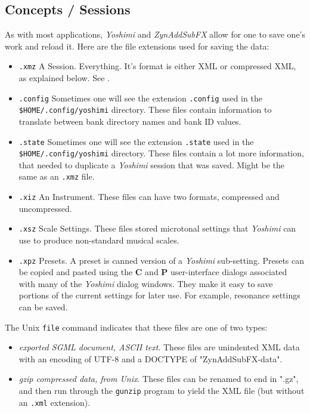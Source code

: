 \subsection{Concepts / Sessions}
\label{subsec:concepts_sessions}

   As with most applications, \textsl{Yoshimi} and \textsl{ZynAddSubFX}
   allow for one to save one's work and reload it.
   Here are the file extensions used for saving the data:

   \begin{itemize}
      \item \texttt{.xmz}
      A Session. Everything.  It's format is either XML
      or compressed XML, as explained below.
      See .
      \item \texttt{.config}
      Sometimes one will see the extension \texttt{.config} used in the
      \texttt{\$HOME/.config/yoshimi} directory.
      These files contain information to translate between bank directory
      names and bank ID values.
      \item \texttt{.state}
      Sometimes one will see the extension \texttt{.state} used in the
      \texttt{\$HOME/.config/yoshimi} directory.
      These files contain a lot more information, that needed to duplicate a
      \textsl{Yoshimi} session that was saved.  Might be the same
      as an \texttt{.xmz} file.
      \item \texttt{.xiz}
      An Instrument.  These files can have two formats, compressed and
      uncompressed.
      \item \texttt{.xsz}
      Scale Settings.
      These files stored microtonal settings that \textsl{Yoshimi}
      can use to produce non-standard musical scales.
      \item \texttt{.xpz}
      Presets.
      A preset is canned version of a \textsl{Yoshimi} sub-setting.
      Presets can be copied and pasted using the
      \textbf{C} and \textbf{P} user-interface dialogs associated with many
      of the \textsl{Yoshimi} dialog windows.
      They make it easy to save portions of the current settings for later
      use.  For example, resonance settings can be saved.
   \end{itemize}

   The Unix \texttt{file} command indicates that these files are one of
   two types:

   \begin{itemize}
      \item \textsl{exported SGML document, ASCII text}.
         These files are unindented XML data with an encoding of UTF-8 and
         a DOCTYPE of "ZynAddSubFX-data".
      \item \textsl{gzip compressed data, from Unix}.
         These files can be renamed to end in ".gz", and then run through
         the \texttt{gunzip} program to yield the XML file (but without an
         \texttt{.xml} extension).
   \end{itemize}

